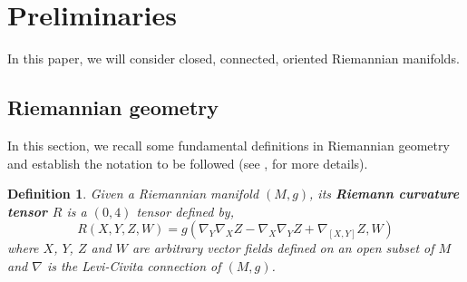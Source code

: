 \documentclass[12pt]{amsart}
\newtheorem{definition}[theorem]{Definition}
\theoremstyle{definition}
\numberwithin{equation}{section}
\begin{document}
\section{Preliminaries}\label{S2}
   In this paper, we will consider closed, connected, oriented Riemannian manifolds. 
\subsection{Riemannian geometry}
\noindent In this section, we recall some fundamental definitions in Riemannian geometry and establish the notation to be followed (see \cite{RGDC}, \cite{RQE} for more details).
\begin{definition}
    Given a Riemannian manifold $(M,g)$, its \textbf{Riemann curvature tensor $R$} is a $(0,4)$ tensor defined by,
    $$R(X,Y,Z,W) = g(\nabla_{Y}\nabla_{X}Z - \nabla_{X}\nabla_{Y}Z + \nabla_{[X,Y]}Z,W)$$
     where $X$, $Y$, $Z$ and $W$ are arbitrary vector fields defined on an open subset of $M$ and $\nabla$ is the Levi-Civita connection of $(M,g)$.
     \end{definition}
   
\end{document}
